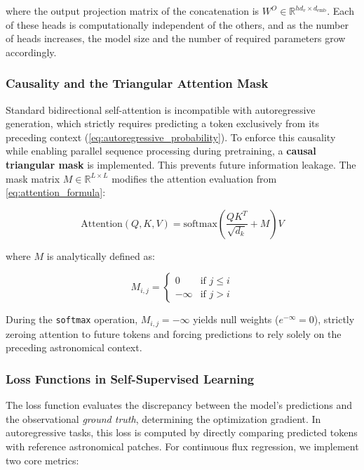 where the output projection matrix of the concatenation is $W^O \in \mathbb{R}^{h d_v \times d_{\text{emb}}}$. Each of these heads is computationally independent of the others, and as the number of heads increases, the model size and the number of required parameters grow accordingly.

\subsubsection{Causality and the Triangular Attention Mask}

Standard bidirectional self-attention is incompatible with autoregressive generation, which strictly requires predicting a token exclusively from its preceding context (\cref{eq:autoregressive_probability}). To enforce this causality while enabling parallel sequence processing during pretraining, a \textbf{causal triangular mask} is implemented. This prevents future information leakage. The mask matrix $M \in \mathbb{R}^{L \times L}$ modifies the attention evaluation from \cref{eq:attention_formula}:

\begin{equation}
\text{Attention}\left(Q, K, V\right) = \text{softmax}\left(\dfrac{Q K^T}{\sqrt{d_k}} + M\right) V
\label{eq:causal_attention}
\end{equation}

where $M$ is analytically defined as:

\begin{equation}
M_{i,j} = \begin{cases} 0 & \text{if } j \le i \\ -\infty & \text{if } j > i \end{cases}
\label{eq:mask_matrix}
\end{equation}

During the \texttt{softmax} operation, $M_{i,j} = -\infty$ yields null weights ($e^{-\infty} = 0$), strictly zeroing attention to future tokens and forcing predictions to rely solely on the preceding astronomical context.

\subsubsection{Loss Functions in Self-Supervised Learning}

The loss function evaluates the discrepancy between the model's predictions and the observational \textit{ground truth}, determining the optimization gradient. In autoregressive tasks, this loss is computed by directly comparing predicted tokens with reference astronomical patches. For continuous flux regression, we implement two core metrics:

